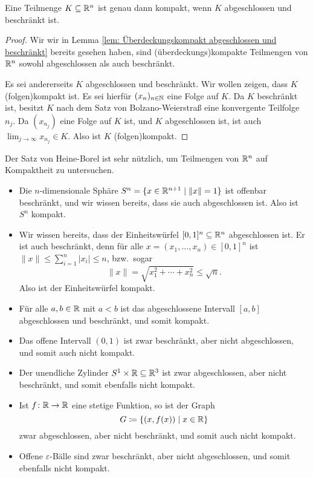 \documentclass[a4paper,10pt]{article}
\begin{document}
\begin{thrm}
 Eine Teilmenge $K \subseteq \mathbb{R}^n$ ist genau dann kompakt, wenn $K$ abgeschlossen und beschränkt ist.
\end{thrm}
\begin{proof}
 Wir wir in Lemma \ref{lem: Überdeckungskompakt abgeschlossen und beschränkt} bereits gesehen haben, sind (über\-deck\-ungs)kom\-pak\-te Teilmengen von $\mathbb{R}^n$ sowohl abgeschlossen als auch beschränkt.
 
 Es sei andererseits $K$ abgeschlossen und beschränkt. Wir wollen zeigen, dass $K$ (folgen)kompakt ist. Es sei hierfür $(x_n)_{n \in \mathbb{N}}$ eine Folge auf $K$. Da $K$ beschränkt ist, besitzt $K$ nach dem Satz von Bolzano-Weierstraß eine konvergente Teilfolge $n_j$. Da $(x_{n_j})$ eine Folge auf $K$ ist, und $K$ abgeschlossen ist, ist auch $\lim_{j \to \infty} x_{n_j} \in K$. Also ist $K$ (folgen)kompakt.
\end{proof}


Der Satz von Heine-Borel ist sehr nützlich, um Teilmengen von $\mathbb{R}^n$ auf Kompaktheit zu untersuchen.


\begin{bsp}
 \begin{itemize}
  \item
   Die $n$-dimensionale Sphäre $S^n = \{x \in \mathbb{R}^{n+1} \mid \|x\| = 1\}$ ist offenbar beschränkt, und wir wissen bereits, dass sie auch abgeschlossen ist. Also ist $S^n$ kompakt.
  \item
   Wir wissen bereits, dass der Einheitswürfel $[0,1]^n \subseteq \mathbb{R}^n$ abgeschlossen ist. Er ist auch beschränkt, denn für alle $x = (x_1, \dotsc, x_n) \in [0,1]^n$ ist $\|x\| \leq \sum_{i=1}^n |x_i| \leq n$, bzw.\ sogar
   \[
    \|x\|
    = \sqrt{x_1^2 + \dotsb + x_n^2}
    \leq \sqrt{n}.
   \]
   Also ist der Einheitswürfel kompakt.
  \item
   Für alle $a,b \in \mathbb{R}$ mit $a < b$ ist das abgeschlossene Intervall $[a,b]$ abgeschlossen und beschränkt, und somit kompakt.
  \item
   Das offene Intervall $(0,1)$ ist zwar beschränkt, aber nicht abgeschlossen, und somit auch nicht kompakt.
  \item
   Der unendliche Zylinder $S^1 \times \mathbb{R} \subseteq \mathbb{R}^3$ ist zwar abgeschlossen, aber nicht beschränkt, und somit ebenfalls nicht kompakt.
  \item
   Ist $f \colon \mathbb{R} \to \mathbb{R}$ eine stetige Funktion, so ist der Graph
   \[
    G \coloneqq \{(x,f(x)) \mid x \in \mathbb{R}\}
   \]
   zwar abgeschlossen, aber nicht beschränkt, und somit auch nicht kompakt.
  \item
   Offene $\varepsilon$-Bälle sind zwar beschränkt, aber nicht abgeschlossen, und somit ebenfalls nicht kompakt.
  \end{itemize}
\end{bsp}
\end{document}
